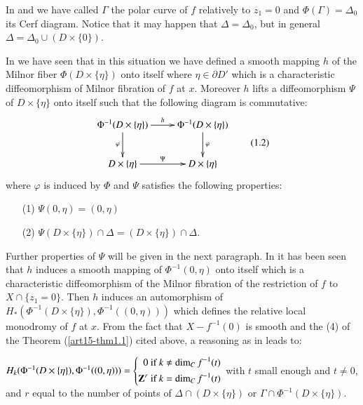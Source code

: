 In \cite{art15-key8} and \cite{art15-key6} we have called $\Gamma$ the polar curve of $f$ relatively to $z_1 = 0$ and $\Phi (\Gamma) = \Delta_0$ its Cerf diagram. Notice that it may happen that $\Delta = \Delta_0$, but in general $\Delta = \Delta_0 \cup (D \times \{0\})$.

In \cite{art15-key6}\pageoriginale we have seen that in this situation we have defined a smooth mapping $h$ of the Milnor fiber $\Phi(D \times \{\eta\})$ onto itself where $\eta \in\partial D'$ which is a characteristic diffeomorphism of Milnor fibration of $f$ at $x$. Moreover $h$ lifts a  diffeomorphism $\Psi$ of $D \times \{\eta\}$ onto itself such that the following diagram is commutative:
\[
\vcenter{
\xymatrix{
\Phi^{-1} (D \times \{\eta\}) \ar[r]^{h} \ar[d]_\varphi & \Phi^{-1} (D \times \{\eta\}) \ar[d]^{\varphi}\\
D \times \{\eta\} \ar[r]^{\Psi} & D \times \{\eta\}
}} \tag{1.2}\label{art15-eq1.2}
\]
where $\varphi$ is induced by $\Phi$ and $\Psi$ satisfies the following properties:
\begin{itemize}
\item[(1)] $\Psi(0,\eta) = (0,\eta)$

\item[(2)] $\Psi (D \times \{\eta\}) \cap \Delta = (D \times \{\eta\}) \cap \Delta$.
\end{itemize}
Further properties of $\Psi$ will be given in the next paragraph. In \cite{art15-key6} it has been seen that $h$ induces a smooth mapping of $\Phi^{-1}(0,\eta)$ onto itself which is a characteristic diffeomorphism of the Milnor fibration of the restriction of $f$ to $X \cap \{z_1 = 0\}$. Then $h$ induces an automorphism of $H_* (\Phi^{-1} (D \times \{\eta\}), \Phi^{-1} ((0,\eta)))$ which defines the relative local monodromy of $f$ at $x$. From the fact that $X - f^{-1} (0)$ is smooth and the (4) of the Theorem (\ref{art15-thm1.1}) cited above, a reasoning as in \cite{art15-key8} leads to:

\setcounter{lemma}{2}
\begin{lemma}\label{art15-lem1.3}
$H_k (\Phi^{-1} (D \times \{\eta\}), \Phi^{-1} ((0,\eta))) =
\left\{  \begin{aligned}
0 \text{ if } k \neq \dim_C f^{-1} (t)\\
\mathbf{Z}^r \text{ if } k = \dim_C f^{-1}(t)
  \end{aligned} \right.$
with $t$ small enough and $t \neq 0$, and $r$ equal to the number of points of $\Delta \cap (D \times \{\eta\})$ or $\Gamma \cap \Phi^{-1} (D \times \{\eta\})$.
\end{lemma}

